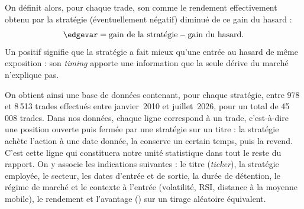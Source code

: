 On définit alors, pour chaque trade, son \edgevar{} comme le rendement
effectivement obtenu par la stratégie (éventuellement négatif) diminué de
ce gain du hasard :
\[
  \edgevar = \text{gain de la stratégie} - \text{gain du hasard}.
\]
Un \edgevar{} positif signifie que la stratégie a fait mieux qu'une entrée
au hasard de même exposition : son \emph{timing} apporte une information
que la seule dérive du marché n'explique pas.

On obtient ainsi une base de données contenant, pour chaque stratégie,
entre 978 et 8\,513 trades effectués entre janvier~2010 et juillet~2026,
pour un total de 45\,008 trades.
Dans nos données, chaque ligne correspond à un trade, c'est-à-dire une
position ouverte puis fermée par une stratégie sur un titre : la stratégie
achète l'action à une date donnée, la conserve un certain temps, puis la
revend. C'est cette ligne qui constituera notre unité statistique dans tout
le reste du rapport.
On y associe les indications suivantes : le titre
(\emph{ticker}), la stratégie employée, le secteur, les dates d'entrée et de
sortie, la durée de détention, le régime de marché et le contexte à l'entrée
(volatilité, RSI, distance à la moyenne mobile), le rendement et l'avantage
(\edgevar{}) sur un tirage aléatoire équivalent.


